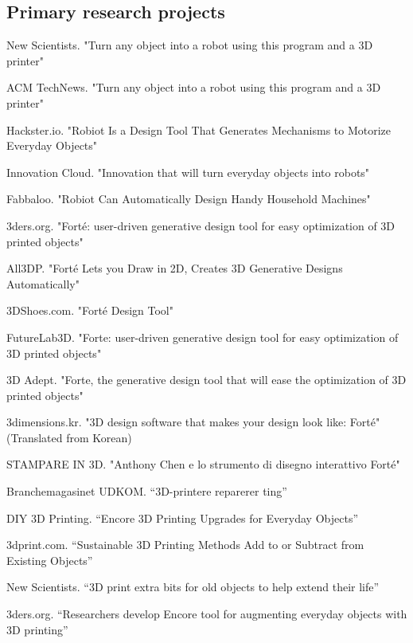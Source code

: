 \subsection{Primary research projects}

 {
	New Scientists. "Turn any object into a robot using this program and a 3D printer"
}

 {
	ACM TechNews. "Turn any object into a robot using this program and a 3D printer"
}

 {
	Hackster.io. "Robiot Is a Design Tool That Generates Mechanisms to Motorize Everyday Objects"
}

 {
Innovation Cloud. "Innovation that will turn everyday objects into robots"
}

 {
	Fabbaloo. "Robiot Can Automatically Design Handy Household Machines"
}


 {
	3ders.org. "Forté: user-driven generative design tool for easy optimization of 3D printed objects"
}

 {
	All3DP. "Forté Lets you Draw in 2D, Creates 3D Generative Designs Automatically"
}

 {
	3DShoes.com. "Forté Design Tool"
}

 {
	FutureLab3D. "Forte: user-driven generative design tool for easy optimization of 3D printed objects"
}

 {
	3D Adept. "Forte, the generative design tool that will ease the optimization of 3D printed objects"
}

 {
	3dimensions.kr. "3D design software that makes your design look like: Forté" (Translated from Korean)
}

 {
	STAMPARE IN 3D. "Anthony Chen e lo strumento di disegno interattivo Forté"
}

 {
	Branchemagasinet UDKOM. “3D-printere reparerer ting” 
}

 {
	DIY 3D Printing. “Encore 3D Printing Upgrades for Everyday Objects”
}

 {
	3dprint.com. “Sustainable 3D Printing Methods Add to or Subtract from Existing Objects”
}

 {
	New Scientists. “3D print extra bits for old objects to help extend their life” 
}

 {
	3ders.org. “Researchers develop Encore tool for augmenting everyday objects with 3D printing” 
}

